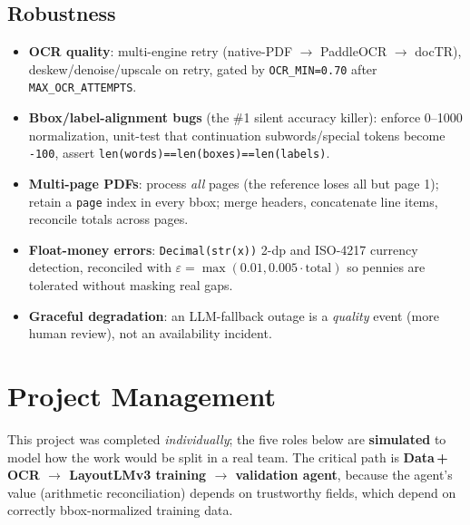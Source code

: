 \documentclass[12pt,a4paper]{article}
\begin{document}
\subsection{Robustness}

\begin{itemize}\setlength\itemsep{0.15em}
  \item \textbf{OCR quality}: multi-engine retry (native-PDF $\to$ PaddleOCR $\to$ docTR), deskew/denoise/upscale on retry, gated by \texttt{OCR\_MIN=0.70} after \texttt{MAX\_OCR\_ATTEMPTS}.
  \item \textbf{Bbox/label-alignment bugs} (the \#1 silent accuracy killer): enforce 0--1000 normalization, unit-test that continuation subwords/special tokens become \texttt{-100}, assert \texttt{len(words)==len(boxes)==len(labels)}.
  \item \textbf{Multi-page PDFs}: process \emph{all} pages (the reference loses all but page 1); retain a \texttt{page} index in every bbox; merge headers, concatenate line items, reconcile totals across pages.
  \item \textbf{Float-money errors}: \texttt{Decimal(str(x))} 2-dp and ISO-4217 currency detection, reconciled with $\varepsilon=\max(0.01,0.005\cdot\text{total})$ so pennies are tolerated without masking real gaps.
  \item \textbf{Graceful degradation}: an LLM-fallback outage is a \emph{quality} event (more human review), not an availability incident.
\end{itemize}

\section{Project Management}

This project was completed \textit{individually}; the five roles below are
\textbf{simulated} to model how the work would be split in a real team. The critical
path is \textbf{Data\,+\,OCR $\to$ LayoutLMv3 training $\to$ validation agent}, because
the agent's value (arithmetic reconciliation) depends on trustworthy fields, which
depend on correctly bbox-normalized training data.
\end{document}
